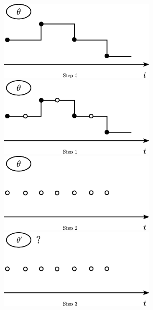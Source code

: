   \begin{figure}[H]
  \centering
  \begin{minipage}[!hp]{0.45\linewidth}
  \centering
    \includegraphics [width=0.70\textwidth, angle=0]{figs/plotn0.pdf}
      \end{minipage}
  \begin{minipage}[!hp]{0.45\linewidth}
  \centering
    \includegraphics [width=0.70\textwidth, angle=0]{figs/plotn1.pdf}
    \vspace{-0 in}
  \end{minipage}
  \begin{minipage}[!hp]{0.45\linewidth}
  \centering
    \includegraphics [width=0.70\textwidth, angle=0]{figs/plotn2.pdf}
    \vspace{-0 in}
  \end{minipage}
  \begin{minipage}[!hp]{0.45\linewidth}
  \centering
    \includegraphics [width=0.70\textwidth, angle=0]{figs/plotn3.pdf}

\end{minipage}
\end{figure}
